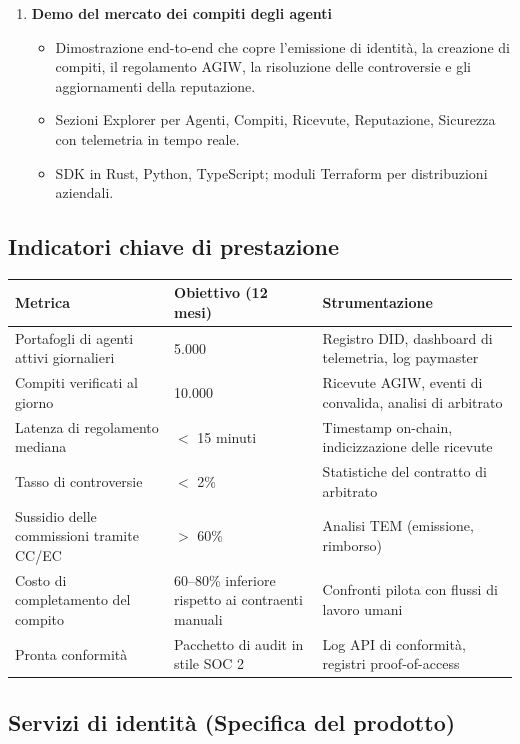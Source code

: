 \documentclass[11pt]{article}
\begin{document}
\begin{enumerate}[label=\textbf{D\arabic*.}, leftmargin=*]
\begin{itemize}[noitemsep]
  \end{itemize}
  \item \textbf{Demo del mercato dei compiti degli agenti}
  \begin{itemize}[noitemsep]
    \item Dimostrazione end-to-end che copre l'emissione di identità, la creazione di compiti, il regolamento AGIW, la risoluzione delle controversie e gli aggiornamenti della reputazione.
    \item Sezioni Explorer per Agenti, Compiti, Ricevute, Reputazione, Sicurezza con telemetria in tempo reale.
    \item SDK in Rust, Python, TypeScript; moduli Terraform per distribuzioni aziendali.
  \end{itemize}
\end{enumerate}

\subsection{Indicatori chiave di prestazione}
\begin{longtable}{@{}p{}p{}p{}@{}}
\toprule
\textbf{Metrica} & \textbf{Obiettivo (12 mesi)} & \textbf{Strumentazione} \\\midrule
Portafogli di agenti attivi giornalieri & 5.000 & Registro DID, dashboard di telemetria, log paymaster \\
Compiti verificati al giorno & 10.000 & Ricevute AGIW, eventi di convalida, analisi di arbitrato \\
Latenza di regolamento mediana & $<$ 15 minuti & Timestamp on-chain, indicizzazione delle ricevute \\
Tasso di controversie & $<$ 2\% & Statistiche del contratto di arbitrato \\
Sussidio delle commissioni tramite CC/EC & $>$ 60\% & Analisi TEM (emissione, rimborso) \\
Costo di completamento del compito & 60--80\% inferiore rispetto ai contraenti manuali & Confronti pilota con flussi di lavoro umani \\
Pronta conformità & Pacchetto di audit in stile SOC 2 & Log API di conformità, registri proof-of-access \\
\bottomrule
\end{longtable}

\subsection{Servizi di identità (Specifica del prodotto)}
\label{sec:identity-spec}
\end{document}
